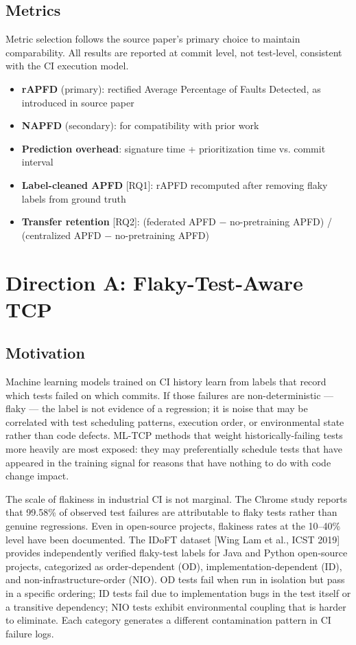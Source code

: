 \documentclass[conference]{IEEEtran}
\begin{document}
\subsection{Metrics}

Metric selection follows the source paper's primary choice to maintain comparability. All results are reported at commit level, not test-level, consistent with the CI execution model.


\begin{itemize}[leftmargin=*]
\item \textbf{rAPFD} (primary): rectified Average Percentage of Faults Detected, as introduced in source paper
\item \textbf{NAPFD} (secondary): for compatibility with prior work
\item \textbf{Prediction overhead}: signature time + prioritization time vs. commit interval
\item \textbf{Label-cleaned APFD} [RQ1]: rAPFD recomputed after removing flaky labels from ground truth
\item \textbf{Transfer retention} [RQ2]: (federated APFD $-$ no-pretraining APFD) / (centralized APFD $-$ no-pretraining APFD)
\end{itemize}



\section{Direction A: Flaky-Test-Aware TCP}

\subsection{Motivation}

Machine learning models trained on CI history learn from labels that record which tests failed on which commits. If those failures are non-deterministic — flaky — the label is not evidence of a regression; it is noise that may be correlated with test scheduling patterns, execution order, or environmental state rather than code defects. ML-TCP methods that weight historically-failing tests more heavily are most exposed: they may preferentially schedule tests that have appeared in the training signal for reasons that have nothing to do with code change impact.


The scale of flakiness in industrial CI is not marginal. The Chrome study reports that 99.58\% of observed test failures are attributable to flaky tests rather than genuine regressions. Even in open-source projects, flakiness rates at the 10–40\% level have been documented. The IDoFT dataset [Wing Lam et al., ICST 2019] provides independently verified flaky-test labels for Java and Python open-source projects, categorized as order-dependent (OD), implementation-dependent (ID), and non-infrastructure-order (NIO). OD tests fail when run in isolation but pass in a specific ordering; ID tests fail due to implementation bugs in the test itself or a transitive dependency; NIO tests exhibit environmental coupling that is harder to eliminate. Each category generates a different contamination pattern in CI failure logs.
\end{document}
